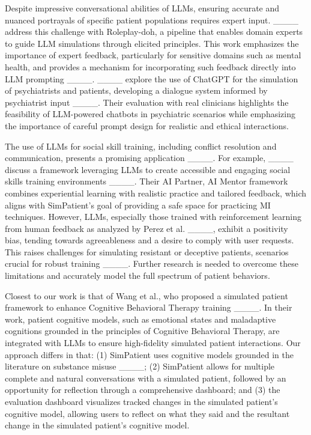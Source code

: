 Despite impressive conversational abilities of LLMs, ensuring accurate and nuanced portrayals of specific patient populations requires expert input. ____ address this challenge with Roleplay-doh, a pipeline that enables domain experts to guide LLM simulations through elicited principles. This work emphasizes the importance of expert feedback, particularly for sensitive domains such as mental health, and provides a mechanism for incorporating such feedback directly into LLM prompting ____. ____ explore the use of ChatGPT for the simulation of psychiatrists and patients, developing a dialogue system informed by psychiatrist input ____. Their evaluation with real clinicians highlights the feasibility of LLM-powered chatbots in psychiatric scenarios while emphasizing the importance of careful prompt design for realistic and ethical interactions.

The use of LLMs for social skill training, including conflict resolution and communication, presents a promising application ____. For example, ____ discuss a framework leveraging LLMs to create accessible and engaging social skills training environments ____. Their AI Partner, AI Mentor framework combines experiential learning with realistic practice and tailored feedback, which aligns with SimPatient's goal of providing a safe space for practicing MI techniques. However, LLMs, especially those trained with reinforcement learning from human feedback as analyzed by Perez et al. ____, exhibit a positivity bias, tending towards agreeableness and a desire to comply with user requests. This raises challenges for simulating resistant or deceptive patients, scenarios crucial for robust training ____. Further research is needed to overcome these limitations and accurately model the full spectrum of patient behaviors.

Closest to our work is that of Wang et al., who proposed a simulated patient framework to enhance Cognitive Behavioral Therapy training ____. In their work, patient cognitive models, such as emotional states and maladaptive cognitions grounded in the principles of Cognitive Behavioral Therapy, are integrated with LLMs to ensure high-fidelity simulated patient interactions. Our approach differs in that: 
(1) SimPatient uses cognitive models grounded in the literature on substance misuse ____; 
(2) SimPatient allows for multiple complete and natural conversations with a simulated patient, followed by an opportunity for reflection through a comprehensive dashboard; and 
(3) the evaluation dashboard visualizes tracked changes in the simulated patient's cognitive model, allowing users to reflect on what they said and the resultant change in the simulated patient's cognitive model.

